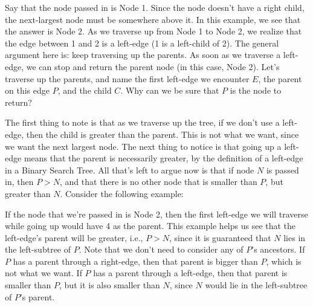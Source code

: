 \begin{solution}[2.5in]
\begin{center}
\end{center}

Say that the node passed in is Node 1. Since the node doesn't have a right
child, the next-largest node must be somewhere above it. In this example, we
see that the answer is Node 2. As we traverse up from Node 1 to Node 2, we
realize that the edge between 1 and 2 is a left-edge (1 is a left-child of 2).
The general argument here is: keep traversing up the parents. As soon as we
traverse a left-edge, we can stop and return the parent node (in this case,
Node 2). Let's traverse up the parents, and name the first left-edge we
encounter $E$, the parent on this edge $P$, and the child $C$. Why can we be
sure that $P$ is the node to return?

The first thing to note is that as we traverse up the tree, if we don't use a
left-edge, then the child is greater than the parent. This is not what we want,
since we want the next largest node. The next thing to notice is that going up
a left-edge means that the parent is necessarily greater, by the definition of
a left-edge in a Binary Search Tree. All that's left to argue now is that if
node $N$ is passed in, then $P>N$, and that there is no other node that is
smaller than $P$, but greater than $N$. Consider the following example:

\begin{center}
\end{center}

If the node that we're passed in is Node 2, then the first left-edge we will
traverse while going up would have 4 as the parent. This example helps us see
that the left-edge's parent will be greater, i.e., $P>N$, since it is
guaranteed that $N$ lies in the left-subtree of $P$. Note that we don't need to
consider any of $P$'s ancestors. If $P$ has a parent through a right-edge, then
that parent is bigger than $P$, which is not what we want. If $P$ has a parent
through a left-edge, then that parent is smaller than $P$, but it is also
smaller than $N$, since $N$ would lie in the left-subtree of $P$'s parent.


\end{solution}
